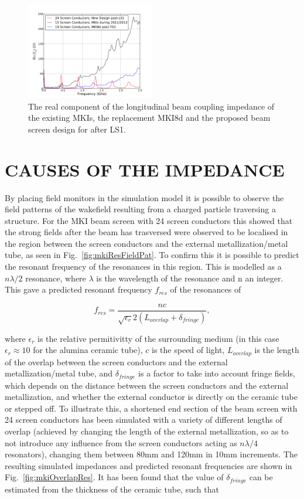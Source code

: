 \documentclass{JAC2003}
\begin{document}
\begin{figure}
\includegraphics[width=0.5\textwidth]{realImp.pdf}
\caption{The real component of the longitudinal beam coupling impedance of the existing MKIs, the replacement MKI8d and the proposed beam screen design for after LS1.}
\label{fig:MKIScreenImp}
\end{figure}

\section{CAUSES OF THE IMPEDANCE}

By placing field monitors in the simulation model it is possible to observe the field patterns of the wakefield resulting from a charged particle traversing a structure. For the MKI beam screen with 24 screen conductors this showed that the strong fields after the beam has trasversed were observed to be localised in the region between the screen conductors and the external metallization/metal tube, as seen in Fig.~\ref{fig:mkiResFieldPat}. To confirm this it is possible to predict the resonant frequency of the resonances in this region. This is modelled as a $n \lambda /2$ resonance, where $\lambda$ is the wavelength of the resonance and n an integer. This gave a predicted resonant frequency $f_{res}$ of the resonances of 

\begin{equation}
f_{res} = \frac{nc}{\sqrt{\epsilon_{r}}2 \left( L_{overlap} + \delta_{fringe} \right)},
\label{eqn:imp-overlap-fres}
\end{equation}

where $\epsilon_{r}$ is the relative permitivitty of the surrounding medium (in this case $\epsilon_{r} \approx 10$ for the alumina ceramic tube), $c$ is the speed of light, $L_{overlap}$ is the length of the overlap between the screen conductors and the external metallization/metal tube, and $\delta_{fringe}$ is a factor to take into account fringe fields, which depends on the distance between the screen conductors and the external metallization, and whether the external conductor is directly on the ceramic tube or stepped off. To illustrate this, a shortened end section of the beam screen with 24 screen conductors has been simulated with a variety of different lengths of overlap (achieved by changing the length of the external metallization, so as to not introduce any influence from the screen conductors acting as $n \lambda /4$ resonators), changing them between 80mm and 120mm in 10mm increments. The resulting simulated impedances and predicted resonant frequencies are shown in Fig.~\ref{fig:mkiOverlapRes}. It has been found that the value of $\delta_{fringe}$ can be estimated from the thickness of the ceramic tube, such that
\end{document}
